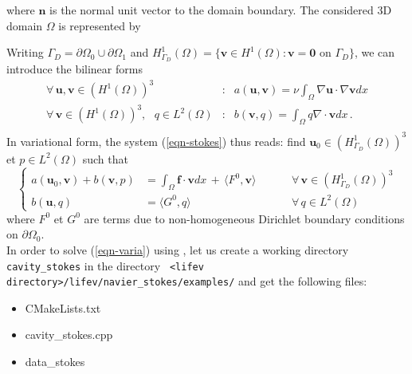 \noindent where $\bm{n}$ is the normal unit vector to the domain boundary. The considered 3D domain $\Omega$ is represented by 

\vspace{0.5cm}
\begin{center}

\end{center}
\vspace{0.5cm}

Writing $\Gamma_D = \partial \Omega_0 \cup \partial\Omega_1$ and $H^1_{\Gamma_D}(\Omega) = \{\bm{v}\in H^1(\Omega) : \bm{v}=\bm{0} \mbox{ on }\Gamma_D\}$, 
we can introduce the bilinear forms 
\begin{eqnarray*}
\displaystyle \forall\, \bm{u},\bm{v} \in \left(H^1(\Omega)\right)^3 & : &
a(\bm{u},\bm{v}) = \nu \int_{\Omega}\nabla \bm{u} \cdot \nabla \bm{v} dx\\
\displaystyle \forall\, \bm{v} \in \left(H^1(\Omega)\right)^3,\mbox{ } q \in L^2(\Omega) & : &
b(\bm{v},q) = \int_{\Omega} q\nabla \cdot \bm{v} dx \,.\\
\end{eqnarray*}
In variational form, the system (\ref{eqn-stokes}) thus reads: find $\bm{u}_0 \in \left(H^1_{\Gamma_D}(\Omega)\right)^3$ et $p \in
L^2(\Omega)$ such that
\begin{equation} \label{eqn-varia}
\left\{
\begin{array}{rlr}
\displaystyle a(\bm{u}_0,\bm{v}) + b(\bm{v},p) & =  \int_\Omega \bm{f}\cdot\bm{v}dx \,+\, \langle F^0, \bm{v} \rangle
& \hspace{1cm} \forall\, \bm{v} \in \left(H^1_{\Gamma_D}(\Omega)\right)^3 \\
b(\bm{u},q) & = \langle G^0, q \rangle & \hspace{1cm} \forall\, q \in L^2(\Omega)
\end{array}
\right.
\end{equation}
where $F^0$ et $G^0$ are terms due to non-homogeneous Dirichlet boundary conditions on $\partial \Omega_0$. \\

In order to solve (\ref{eqn-varia}) using \lifev, let us create a working directory \verb+cavity_stokes+ in the directory \verb+ <lifev directory>/lifev/navier_stokes/examples/+ and get the following files:
 
\begin{itemize}
\item CMakeLists.txt
\item cavity\_stokes.cpp
\item data\_stokes
\end{itemize}

